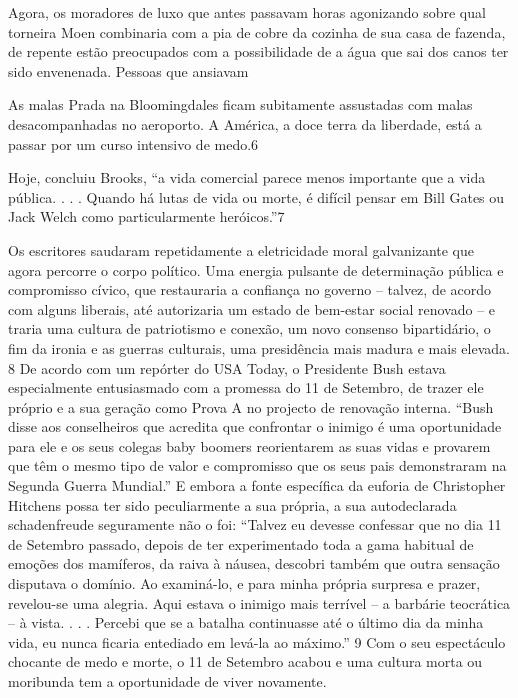 \par 
Agora, os moradores de luxo que antes passavam horas agonizando sobre qual torneira Moen combinaria com a pia de cobre da cozinha de sua casa de fazenda, de repente estão preocupados com a possibilidade de a água que sai dos canos ter sido envenenada. Pessoas que ansiavam
 \par 
As malas Prada na Bloomingdales ficam subitamente assustadas com malas desacompanhadas no aeroporto. A América, a doce terra da liberdade, está a passar por um curso intensivo de medo.{\color{blue}6}
 \par 
Hoje, concluiu Brooks, “a vida comercial parece menos importante que a vida pública. . . . Quando há lutas de vida ou morte, é difícil pensar em Bill Gates ou Jack Welch como particularmente heróicos.”{\color{blue}7}
 \par 
Os escritores saudaram repetidamente a eletricidade moral galvanizante que agora percorre o corpo político. Uma energia pulsante de determinação pública e compromisso cívico, que restauraria a confiança no governo – talvez, de acordo com alguns liberais, até autorizaria um estado de bem-estar social renovado – e traria uma cultura de patriotismo e conexão, um novo consenso bipartidário, o fim da ironia e as guerras culturais, uma presidência mais madura e mais elevada. {\color{blue}8} De acordo com um repórter do USA Today, o Presidente Bush estava especialmente entusiasmado com a promessa do {\color{blue}11} de Setembro, de trazer ele próprio e a sua geração como Prova A no projecto de renovação interna. “Bush disse aos conselheiros que acredita que confrontar o inimigo é uma oportunidade para ele e os seus colegas baby boomers reorientarem as suas vidas e provarem que têm o mesmo tipo de valor e compromisso que os seus pais demonstraram na Segunda Guerra Mundial.” E embora a fonte específica da euforia de Christopher Hitchens possa ter sido peculiarmente a sua própria, a sua autodeclarada schadenfreude seguramente não o foi: “Talvez eu devesse confessar que no dia {\color{blue}11} de Setembro passado, depois de ter experimentado toda a gama habitual de emoções dos mamíferos, da raiva à náusea, descobri também que outra sensação disputava o domínio. Ao examiná-lo, e para minha própria surpresa e prazer, revelou-se uma alegria. Aqui estava o inimigo mais terrível – a barbárie teocrática – à vista. . . . Percebi que se a batalha continuasse até o último dia da minha vida, eu nunca ficaria entediado em levá-la ao máximo.” {\color{blue}9} Com o seu espectáculo chocante de medo e morte, o {\color{blue}11} de Setembro acabou e uma cultura morta ou moribunda tem a oportunidade de viver novamente.
